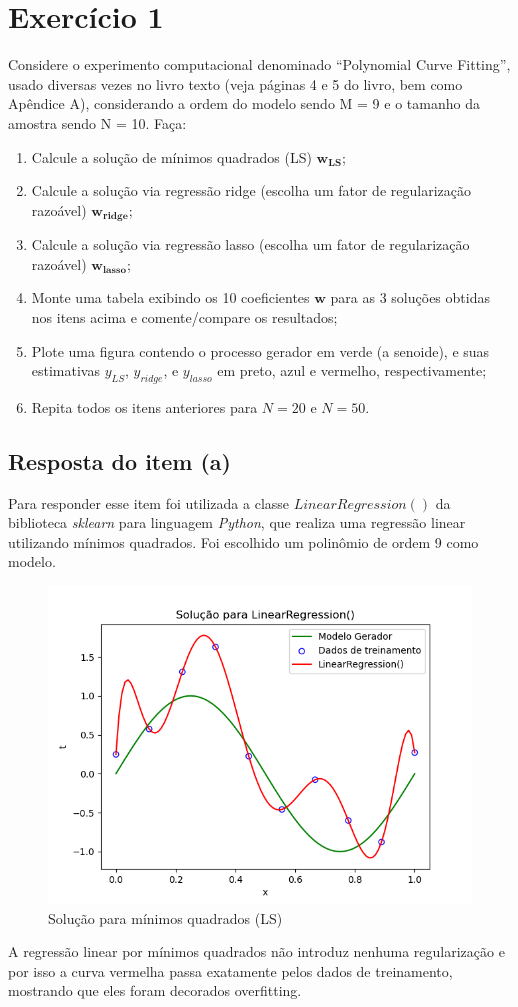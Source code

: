 \section{Exercício 1}

Considere o experimento computacional denominado “Polynomial Curve Fitting”, usado
diversas vezes no livro texto (veja páginas 4 e 5 do livro, bem como Apêndice A), considerando a
ordem do modelo sendo M = 9 e o tamanho da amostra sendo N = 10.
Faça:

\begin{enumerate}[label=(\alph*)]
    \item Calcule a solução de mínimos quadrados (LS) \( \mathbf{w_{LS}} \);
    \item Calcule a solução via regressão ridge (escolha um fator de regularização razoável) \( \mathbf{w_{ridge}} \);
    \item Calcule a solução via regressão lasso (escolha um fator de regularização razoável) \( \mathbf{w_{lasso}} \);
    \item Monte uma tabela exibindo os 10 coeficientes \( \mathbf{w} \) para as 3 soluções obtidas nos itens acima e comente/compare os resultados;
    \item Plote uma figura contendo o processo gerador em verde (a senoide), e suas estimativas \( y_{LS} \), \( y_{ridge} \), e \( y_{lasso} \) em preto, azul e vermelho, respectivamente;
    \item Repita todos os itens anteriores para \( N=20 \) e \( N=50 \).
\end{enumerate}

\subsection{Resposta do item (a)}
Para responder esse item foi utilizada a classe $LinearRegression()$ da biblioteca \textit{sklearn} para linguagem \textit{Python}, que realiza uma regressão linear utilizando mínimos quadrados. Foi escolhido um polinômio de ordem 9 como modelo.
\begin{figure}[H]
    \centering
    \caption{Solução para mínimos quadrados (LS)}
    \includegraphics[width=12cm]{E1_a.png}
\end{figure}
A regressão linear por mínimos quadrados não introduz nenhuma regularização e por isso a curva vermelha passa exatamente pelos dados de treinamento, mostrando que eles foram decorados overfitting.


